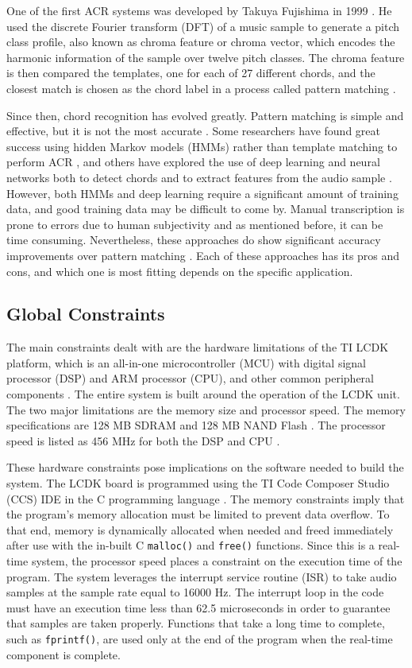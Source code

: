 \documentclass[journal]{IEEEtran}
\begin{document}
One of the first ACR systems was developed by Takuya Fujishima in 1999 \cite{pauwels}.
He used the discrete Fourier transform (DFT) of a music sample to generate a pitch class profile, also known as chroma feature or chroma vector, which encodes the harmonic information of the sample over twelve pitch classes.
The chroma feature is then compared the templates, one for each of 27 different chords, and the closest match is chosen as the chord label in a process called pattern matching \cite{fujishima}.

Since then, chord recognition has evolved greatly.
Pattern matching is simple and effective, but it is not the most accurate \cite{jiang}.
Some researchers have found great success using hidden Markov models (HMMs) rather than template matching to perform ACR \cite{sheh}, and others have explored the use of deep learning and neural networks both to detect chords \cite{boulanger} and to extract features from the audio sample \cite{korzeniowski}.
However, both HMMs and deep learning require a significant amount of training data, and good training data may be difficult to come by.
Manual transcription is prone to errors due to human subjectivity \cite{pauwels} and as mentioned before, it can be time consuming.
Nevertheless, these approaches do show significant accuracy improvements over pattern matching \cite{jiang, boulanger}.
Each of these approaches has its pros and cons, and which one is most fitting depends on the specific application.


\subsection{Global Constraints}
The main constraints dealt with are the hardware limitations of the TI LCDK platform, which is an all-in-one microcontroller (MCU) with digital signal processor (DSP) and ARM processor (CPU), and other common peripheral components \cite{lcdk}.
The entire system is built around the operation of the LCDK unit.
The two major limitations are the memory size and processor speed.
The memory specifications are 128 MB SDRAM and 128 MB NAND Flash \cite{lcdk}.
The processor speed is listed as 456 MHz for both the DSP and CPU \cite{lcdk}.

These hardware constraints pose implications on the software needed to build the system.
The LCDK board is programmed using the TI Code Composer Studio (CCS) IDE in the C programming language \cite{lcdk}.
The memory constraints imply that the program’s memory allocation must be limited to prevent data overflow.
To that end, memory is dynamically allocated when needed and freed immediately after use with the in-built C \texttt{malloc()} and \texttt{free()} functions.
Since this is a real-time system, the processor speed places a constraint on the execution time of the program.
The system leverages the interrupt service routine (ISR) to take audio samples at the sample rate equal to 16000 Hz.
The interrupt loop in the code must have an execution time less than 62.5 microseconds in order to guarantee that samples are taken properly.
Functions that take a long time to complete, such as \texttt{fprintf()}, are used only at the end of the program when the real-time component is complete.
\end{document}
